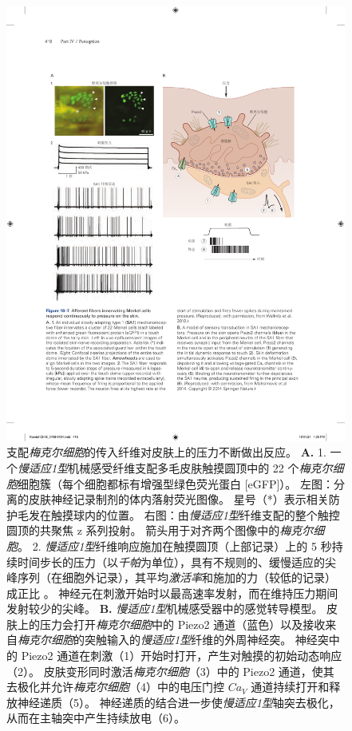 \begin{figure}[htbp]
	\centering
	\includegraphics[width=1.0\linewidth]{chap18/fig_18_7}
	\caption{支配\textit{梅克尔细胞}的传入纤维对皮肤上的压力不断做出反应。
		\textbf{A.} 1. 一个\textit{慢适应1型}机械感受纤维支配多毛皮肤触摸圆顶中的 22 个\textit{梅克尔细胞}细胞簇（每个细胞都标有增强型绿色荧光蛋白 [eGFP]）。
		左图：分离的皮肤神经记录制剂的体内落射荧光图像。
		星号（*）表示相关防护毛发在触摸球内的位置。
		右图：由\textit{慢适应1型}纤维支配的整个触控圆顶的共聚焦 z 系列投射。
		箭头用于对齐两个图像中的\textit{梅克尔细胞}。
		2. \textit{慢适应1型}纤维响应施加在触摸圆顶（上部记录）上的 5 秒持续时间步长的压力（以\textit{千帕}为单位），具有不规则的、缓慢适应的尖峰序列（在细胞外记录），其平均\textit{激活率}和施加的力（较低的记录）成正比 。
		神经元在刺激开始时以最高速率发射，而在维持压力期间发射较少的尖峰。
		\textbf{B.} \textit{慢适应1型}机械感受器中的感觉转导模型。
		皮肤上的压力会打开\textit{梅克尔细胞}中的 Piezo2 通道（蓝色）以及接收来自\textit{梅克尔细胞}的突触输入的\textit{慢适应1型}纤维的外周神经突。
		神经突中的 Piezo2 通道在刺激（1）开始时打开，产生对触摸的初始动态响应（2）。
		皮肤变形同时激活\textit{梅克尔细胞}（3）中的 Piezo2 通道，使其去极化并允许\textit{梅克尔细胞}（4）中的电压门控 $Ca_V$ 通道持续打开和释放神经递质（5）。
		神经递质的结合进一步使\textit{慢适应1型}轴突去极化，从而在主轴突中产生持续放电（6）\cite{maksimovic2014epidermal}。}
	\label{fig:18_7}
\end{figure}


